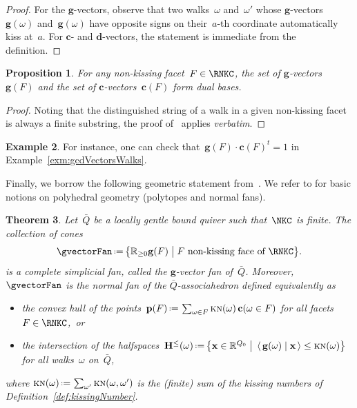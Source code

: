 \documentclass{amsart}
\newtheorem{theorem}{Theorem}[section]
\newtheorem{proposition}[theorem]{Proposition}
\theoremstyle{definition}
\newtheorem{example}[theorem]{Example}
\newcommand{\R}{\mathbb{R}} %
\renewcommand{\b}[1]{\mathbf{#1}} %
\newcommand{\bigset}[2]{\big\{ #1 \;\big|\; #2 \big\}} %
\newcommand{\dotprod}[2]{\left\langle \, #1 \; \middle| \; #2 \, \right\rangle} %
\newcommand{\eqdef}{\mbox{\,\raisebox{0.2ex}{\scriptsize\ensuremath{\mathrm:}}\ensuremath{=}\,}} %
\newcommand{\transpose}[1]{{#1}^t} %
\newcommand{\darkblue}{\color{darkblue}} %
\newcommand{\defn}[1]{\textsl{\darkblue #1}} %
\newcommand{\KN}{\textsc{kn}} %
\newcommand{\gvector}[1]{\mathbf{g}(#1)} %
\newcommand{\gvectors}[1]{\mathbf{g}(#1)} %
\newcommand{\cvector}[2]{\mathbf{c}(#1 \in #2)} %
\newcommand{\cvectors}[1]{\mathbf{c}(#1)} %
\newcommand{\point}[1]{\mathbf{p}(#1)} %
\newcommand{\HS}[1]{\mathbf{H}^{\le}(#1)} %
\begin{document}
\begin{proof}
For the $\b{g}$-vectors, observe that two walks~$\omega$ and~$\omega'$ whose $\b{g}$-vectors~$\gvector{\omega}$ and~$\gvector{\omega}$ have opposite signs on their~$a$-th coordinate automatically kiss at~$a$.
For $\b{c}$- and $\b{d}$-vectors, the statement is immediate from the definition.
\end{proof}

\begin{proposition}
\label{prop:gvectorscvectorsDualBases}
For any non-kissing facet~$F \in \RNKC$, the set of $\b{g}$-vectors~$\gvectors{F}$ and the set of $\b{c}$-vectors~$\cvectors{F}$ form dual bases. 
\end{proposition}

\begin{proof}
Noting that the distinguished string of a walk in a given non-kissing facet is always a finite substring, the proof of~\cite[Proposition 4.16]{PaluPilaudPlamondon} applies \emph{verbatim}.
\end{proof}

\begin{example}
For instance, one can check that~$\gvectors{F} \cdot \transpose{\cvectors{F}} = 1$ in Example~\ref{exm:gcdVectorsWalks}.
\end{example}

Finally, we borrow the following geometric statement from~\cite{PaluPilaudPlamondon}.
We refer to \cite{Ziegler-polytopes} for basic notions on polyhedral geometry (polytopes and normal fans).

\begin{theorem}
\label{thm:fanAssociahedron}
Let~$\bar Q$ be a locally gentle bound quiver such that~$\NKC$ is finite. The collection of cones
\[
\gvectorFan \eqdef \bigset{\R_{\ge0} \gvectors{F}}{F \text{ non-kissing face of } \RNKC}.
\]
is a complete simplicial fan, called the \defn{$\b{g}$-vector fan} of~$\bar Q$.
Moreover, $\gvectorFan$ is the normal fan of the \defn{$\bar Q$-associahedron} defined equivalently as
\begin{itemize}
\item the convex hull of the points~$\point{F} \eqdef \sum_{\omega \in F} \KN(\omega) \, \cvector{\omega}{F}$ for all facets~${F \in \RNKC}$,~or
\item the intersection of the halfspaces~$\HS{\omega} \eqdef \bigset{\b{x} \in \R^{Q_0}}{\dotprod{\gvector{\omega}}{\b{x}} \le \KN(\omega)}$ for all walks~$\omega$ on~$\bar Q$,
\end{itemize}
where $\KN(\omega) \eqdef \sum_{\omega'} \KN(\omega,\omega')$ is the (finite) sum of the kissing numbers of Definition~\ref{def:kissingNumber}.
\end{theorem}
\end{document}
